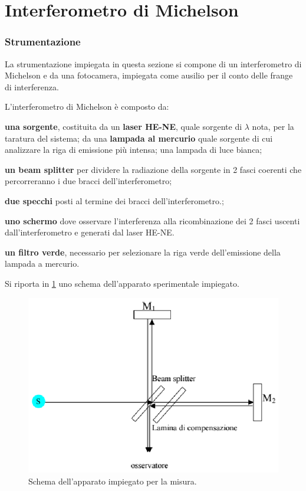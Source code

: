 \part{Interferometro di Michelson }

\section{Strumentazione}
La strumentazione impiegata in questa sezione  si 
compone di un interferometro di Michelson e da una fotocamera,
impiegata come ausilio per il conto delle frange di interferenza.

L'interferometro di Michelson è composto da:
\begin{list}{}{}
\item \textbf{una sorgente}, costituita da un \textbf{laser HE-NE}, 
quale sorgente di $\lambda$ nota,
per la taratura del sistema; da una \textbf{lampada al mercurio} quale 
sorgente di cui analizzare la riga di emissione più intensa; una lampada
di luce bianca;
\item \textbf{un beam splitter} per dividere la radiazione della sorgente
in 2 fasci coerenti che percorreranno i
due bracci dell'interferometro;
\item \textbf{due specchi} posti al termine dei bracci 
dell'interferometro.;
\item \textbf{uno schermo} dove osservare l'interferenza alla ricombinazione dei 2 
fasci uscenti dall'interferometro e generati dal laser HE-NE.
\item \textbf{un filtro verde}, necessario per selezionare 
la riga verde dell'emissione della lampada a mercurio.
\end{list}
\bigskip

Si riporta in \figurename{ \ref{fig:schema_appar2}} uno schema dell'apparato sperimentale impiegato. 
\begin{figure} [!h]
	\centering
	\includegraphics[scale=0.5]{./pictures/immagine2}
	\caption{Schema dell'apparato impiegato per la misura.}
	\label{fig:schema_appar2}
\end{figure}
